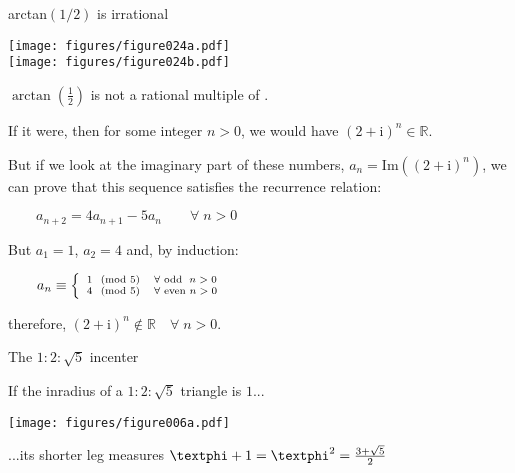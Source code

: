 \documentclass[14pt]{beamer}
\begin{document}
    \begin{frame}{arctan$(1/2)$ is irrational}
        \begin{center}
            \begin{minipage}{0.45\textwidth}%
                \texttt{[image: figures/figure024a.pdf]} \\[2ex]
                \texttt{[image: figures/figure024b.pdf]} \\
            \end{minipage}\hfill\begin{minipage}{0.5\textwidth}
                \footnotesize

                $\arctan(\tfrac{1}{2})$ is not a rational multiple of \textpi.\bigskip

                If it were, then for some integer $n>0$, we would have $(2\!+\!\text{i})^n \in \mathbb{R}$.\bigskip

                But if we look at the imaginary part of these numbers, $a_n = \text{Im}((2\!+\!\text{i})^n)$, we can prove that this sequence satisfies the recurrence relation:\bigskip

                $\qquad a_{n+2} = 4 a_{n+1} - 5 a_n\qquad \forall\; n > 0$\bigskip

                But $a_1 = 1$, $a_2 = 4$ and, by induction:\bigskip

                $\qquad a_n \equiv \left\{ {\scriptsize  \begin{array}{ll}
                                                        1\;\pmod{5} & \forall\text{ odd }\; n > 0\\
                                                        4\;\pmod{5} & \forall\text{ even } n > 0\\
                                                    \end{array}}\right. $\bigskip

                therefore, $(2\!+\!\text{i})^n \notin \mathbb{R} \quad \forall\; n > 0$.\bigskip
            \end{minipage}
        \end{center}
    \end{frame}


    \begin{frame}{The $1\!\!:\!\!2\!\!:\!\!\sqrt{5}$ incenter}
        \begin{center}
            If the inradius of a $1\!\!:\!\!2\!\!:\!\!\sqrt{5}$ triangle is $1$...

            \bigskip \bigskip

            \texttt{[image: figures/figure006a.pdf]}

            \bigskip \bigskip

            ...its shorter leg measures $\text{\textphi}+1 = \text{\textphi}^2 = \frac{3+\sqrt{5}}{2}$
        \end{center}
    \end{frame}
\end{document}
